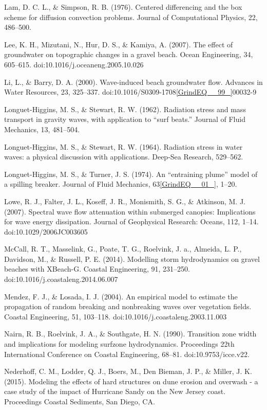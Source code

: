 \documentclass{article}
\begin{document}
\noindent Lam, D. C. L., \& Simpson, R. B. (1976). Centered differencing and the box scheme for diffusion convection problems. Journal of Computational Physics, 22, 486--500.

\noindent Lee, K. H., Mizutani, N., Hur, D. S., \& Kamiya, A. (2007). The effect of groundwater on topographic changes in a gravel beach. Ocean Engineering, 34, 605--615. doi:10.1016/j.oceaneng.2005.10.026

\noindent Li, L., \& Barry, D. A. (2000). Wave-induced beach groundwater flow. Advances in Water Resources, 23, 325--337. doi:10.1016/S0309-1708\eqref{GrindEQ__99_}00032-9

\noindent Longuet-Higgins, M. S., \& Stewart, R. W. (1962). Radiation stress and mass transport in gravity waves, with application to ``surf beats.'' Journal of Fluid Mechanics, 13, 481--504.

\noindent Longuet-Higgins, M. S., \& Stewart, R. W. (1964). Radiation stress in water waves: a physical discussion with applications. Deep-Sea Research, 529--562.

\noindent Longuet-Higgins, M. S., \& Turner, J. S. (1974). An ``entraining plume'' model of a spilling breaker. Journal of Fluid Mechanics, 63\eqref{GrindEQ__01_}, 1--20.

\noindent Lowe, R. J., Falter, J. L., Koseff, J. R., Monismith, S. G., \& Atkinson, M. J. (2007). Spectral wave flow attenuation within submerged canopies: Implications for wave energy dissipation. Journal of Geophysical Research: Oceans, 112, 1--14. doi:10.1029/2006JC003605

\noindent McCall, R. T., Masselink, G., Poate, T. G., Roelvink, J. a., Almeida, L. P., Davidson, M., \& Russell, P. E. (2014). Modelling storm hydrodynamics on gravel beaches with XBeach-G. Coastal Engineering, 91, 231--250. doi:10.1016/j.coastaleng.2014.06.007

\noindent Mendez, F. J., \& Losada, I. J. (2004). An empirical model to estimate the propagation of random breaking and nonbreaking waves over vegetation fields. Coastal Engineering, 51, 103--118. doi:10.1016/j.coastaleng.2003.11.003

\noindent Nairn, R. B., Roelvink, J. A., \& Southgate, H. N. (1990). Transition zone width and implications for modeling surfzone hydrodynamics. Proceedings 22th International Conference on Coastal Engineering, 68--81. doi:10.9753/icce.v22.

\noindent Nederhoff, C. M., Lodder, Q. J., Boers, M., Den Bieman, J. P., \& Miller, J. K. (2015). Modeling the effects of hard structures on dune erosion and overwash - a case study of the impact of Hurricane Sandy on the New Jersey coast. Proceedings Coastal Sediments, San Diego, CA.
\end{document}
